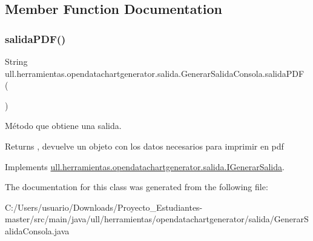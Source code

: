 \subsection{Member Function Documentation}
\mbox{\label{classull_1_1herramientas_1_1opendatachartgenerator_1_1salida_1_1_generar_salida_consola_a77ed2e5c73405f6fc732597ff06e421c}} 
\subsubsection{\texorpdfstring{salida\+P\+D\+F()}{salidaPDF()}}
{\footnotesize\ttfamily String ull.\+herramientas.\+opendatachartgenerator.\+salida.\+Generar\+Salida\+Consola.\+salida\+P\+DF (\begin{DoxyParamCaption}{ }\end{DoxyParamCaption})}



Método que obtiene una salida. 

\begin{DoxyReturn}{Returns}
, devuelve un objeto con los datos necesarios para imprimir en pdf 
\end{DoxyReturn}


Implements \mbox{\hyperlink{interfaceull_1_1herramientas_1_1opendatachartgenerator_1_1salida_1_1_i_generar_salida_ac79d306ba661c9ee5375874289a3aa26}{ull.\+herramientas.\+opendatachartgenerator.\+salida.\+I\+Generar\+Salida}}.



The documentation for this class was generated from the following file\+:\begin{DoxyCompactItemize}
\item 
C\+:/\+Users/usuario/\+Downloads/\+Proyecto\+\_\+\+Estudiantes-\/master/src/main/java/ull/herramientas/opendatachartgenerator/salida/Generar\+Salida\+Consola.\+java\end{DoxyCompactItemize}
